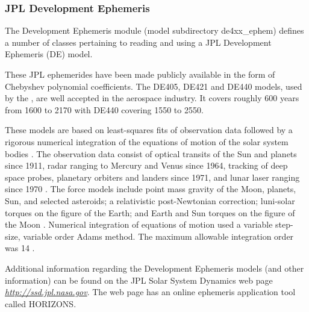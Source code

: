\subsubsection{JPL Development Ephemeris}
The Development Ephemeris module (model subdirectory de4xx\_ephem)
defines a number of classes pertaining to reading and using a JPL
Development Ephemeris (DE) model.

These JPL ephemerides have 
been made publicly available in the form of Chebyshev polynomial coefficients.  
The DE405, DE421 and DE440 models, used by the \ModelDesc, are well accepted in 
the aerospace industry. It covers roughly 600 years from 1600 to 2170 \cite{MG} 
with DE440 covering 1550 to 2550.

These models are based on least-squares fits of observation data 
followed by a rigorous numerical integration of the equations of motion 
of the solar system bodies \cite{heafner}.
The observation data consist of optical 
transits of the Sun and planets since 1911, radar ranging to Mercury and 
Venus since 1964, tracking of deep space probes, planetary orbiters and 
landers since 1971, and lunar laser ranging since 1970 \cite{MG}.  The 
force models include point mass gravity of the Moon, planets, Sun, and 
selected asteroids; a relativistic post-Newtonian correction; luni-solar 
torques on the figure of the Earth; and Earth and Sun torques on the 
figure of the Moon \cite{MG,Seidelmann}.  Numerical integration of equations 
of motion used a variable step-size, variable order Adams method.  The 
maximum allowable integration order was 14 \cite{Seidelmann}.

Additional information regarding the Development Ephemeris models 
(and other information) can be found on the JPL Solar System 
Dynamics web page \href{http://ssd.jpl.nasa.gov}{\em http://ssd.jpl.nasa.gov}.  
The web page has an online ephemeris application tool called HORIZONS.

